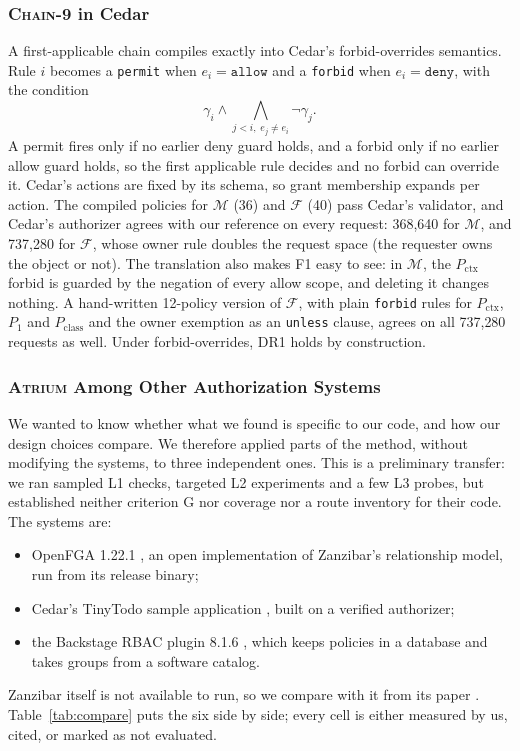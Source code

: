 \documentclass[sigconf,review,anonymous]{acmart}
\newcommand{\sysname}{\textsc{Atrium}\xspace}
\newcommand{\sysname}{\textsc{OpenZTAC}\xspace}
\newcommand{\chain}{\textsc{Chain-9}\xspace}
\newcommand{\Pc}{P_{\mathrm{class}}}
\newcommand{\Px}{P_{\mathrm{ctx}}}
\newcommand{\allowv}{\mathtt{allow}}
\newcommand{\denyv}{\mathtt{deny}}
\begin{document}
\subsubsection{\chain in Cedar}

A first-applicable chain compiles exactly into Cedar's forbid-overrides semantics. Rule $i$ becomes a
\texttt{permit} when $e_i=\allowv$ and a \texttt{forbid} when $e_i=\denyv$, with the condition
\[
\gamma_i\wedge\textstyle\bigwedge_{j<i,\;e_j\neq e_i}\neg\gamma_j .
\]
A permit fires only if no earlier deny guard holds, and a forbid only if no earlier allow guard holds, so the
first applicable rule decides and no forbid can override it. Cedar's actions are fixed by its schema, so grant
membership expands per action. The compiled policies for $\mathcal{M}$ (36) and $\mathcal{F}$ (40) pass Cedar's
validator, and Cedar's authorizer agrees with our reference on every request: 368{,}640 for $\mathcal{M}$, and
737{,}280 for $\mathcal{F}$, whose owner rule doubles the request space (the requester owns the object or not).
The translation also makes F1 easy to see: in $\mathcal{M}$, the $\Px$ forbid is guarded by the negation of every
allow scope, and deleting it changes nothing. A hand-written 12-policy version of $\mathcal{F}$, with plain
\texttt{forbid} rules for $\Px$, $P_1$ and $\Pc$ and the owner exemption as an \texttt{unless} clause, agrees on
all 737{,}280 requests as well. Under forbid-overrides, DR1 holds by construction.

\subsubsection{\sysname Among Other Authorization Systems}
\label{sec:compare}

We wanted to know whether what we found is specific to our code, and how our design choices compare. We
therefore applied parts of the method, without modifying the systems, to three independent ones. This is a
preliminary transfer: we ran sampled L1 checks, targeted L2 experiments and a few L3 probes, but established
neither criterion G nor coverage nor a route inventory for their code. The systems are:
\begin{itemize}
\item OpenFGA 1.22.1 \cite{openfga}, an open implementation of Zanzibar's relationship model, run from its
release binary;
\item Cedar's TinyTodo sample application \cite{cedarexamples}, built on a verified authorizer;
\item the Backstage RBAC plugin 8.1.6 \cite{backstagerbac}, which keeps policies in a database and takes groups
from a software catalog.
\end{itemize} Zanzibar
itself is not available to run, so we compare with it from its paper \cite{pang2019zanzibar}.
Table~\ref{tab:compare} puts the six side by side; every cell is either measured by us, cited, or marked as not
evaluated.
\end{document}
